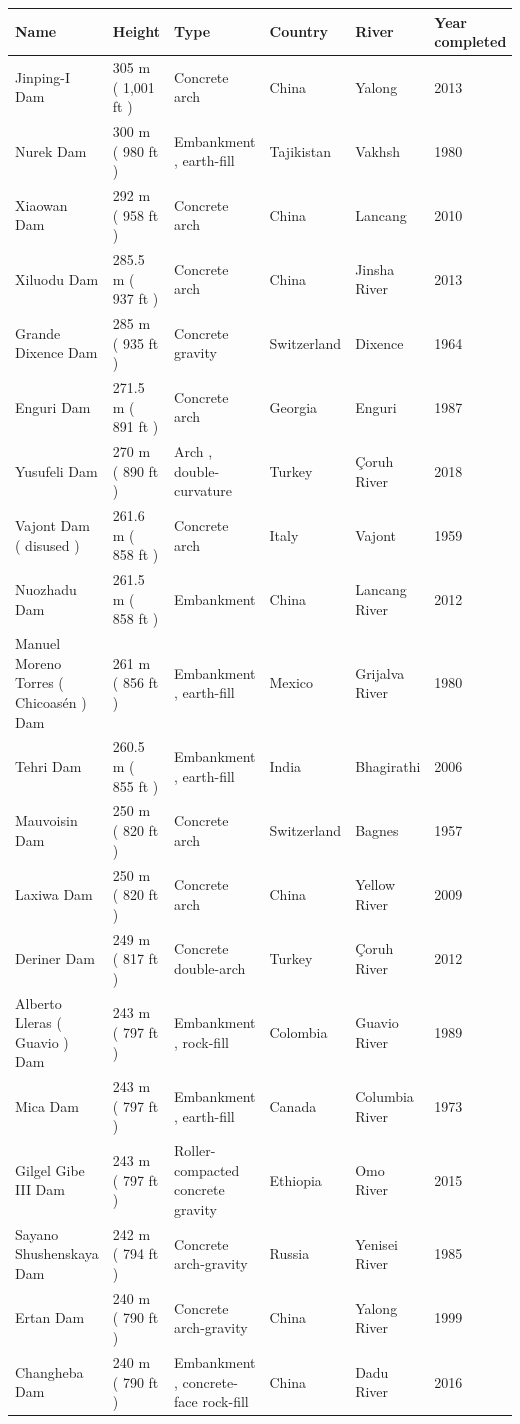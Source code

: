 \documentclass{article}
\begin{document}
\begin{tabular}{llllll}
\toprule
Name & Height & Type & Country & River & Year completed \\
\midrule
Jinping-I Dam & 305 m ( 1,001 ft ) & Concrete arch & China & Yalong & 2013 \\
Nurek Dam & 300 m ( 980 ft ) & Embankment , earth-fill & Tajikistan & Vakhsh & 1980 \\
Xiaowan Dam & 292 m ( 958 ft ) & Concrete arch & China & Lancang & 2010 \\
Xiluodu Dam & 285.5 m ( 937 ft ) & Concrete arch & China & Jinsha River & 2013 \\
Grande Dixence Dam & 285 m ( 935 ft ) & Concrete gravity & Switzerland & Dixence & 1964 \\
Enguri Dam & 271.5 m ( 891 ft ) & Concrete arch & Georgia & Enguri & 1987 \\
Yusufeli Dam & 270 m ( 890 ft ) & Arch , double-curvature & Turkey & Çoruh River & 2018 \\
Vajont Dam ( disused ) & 261.6 m ( 858 ft ) & Concrete arch & Italy & Vajont & 1959 \\
Nuozhadu Dam & 261.5 m ( 858 ft ) & Embankment & China & Lancang River & 2012 \\
Manuel Moreno Torres ( Chicoasén ) Dam & 261 m ( 856 ft ) & Embankment , earth-fill & Mexico & Grijalva River & 1980 \\
Tehri Dam & 260.5 m ( 855 ft ) & Embankment , earth-fill & India & Bhagirathi & 2006 \\
Mauvoisin Dam & 250 m ( 820 ft ) & Concrete arch & Switzerland & Bagnes & 1957 \\
Laxiwa Dam & 250 m ( 820 ft ) & Concrete arch & China & Yellow River & 2009 \\
Deriner Dam & 249 m ( 817 ft ) & Concrete double-arch & Turkey & Çoruh River & 2012 \\
Alberto Lleras ( Guavio ) Dam & 243 m ( 797 ft ) & Embankment , rock-fill & Colombia & Guavio River & 1989 \\
Mica Dam & 243 m ( 797 ft ) & Embankment , earth-fill & Canada & Columbia River & 1973 \\
Gilgel Gibe III Dam & 243 m ( 797 ft ) & Roller-compacted concrete gravity & Ethiopia & Omo River & 2015 \\
Sayano Shushenskaya Dam & 242 m ( 794 ft ) & Concrete arch-gravity & Russia & Yenisei River & 1985 \\
Ertan Dam & 240 m ( 790 ft ) & Concrete arch-gravity & China & Yalong River & 1999 \\
Changheba Dam & 240 m ( 790 ft ) & Embankment , concrete-face rock-fill & China & Dadu River & 2016 \\
\bottomrule
\end{tabular}
\end{document}
